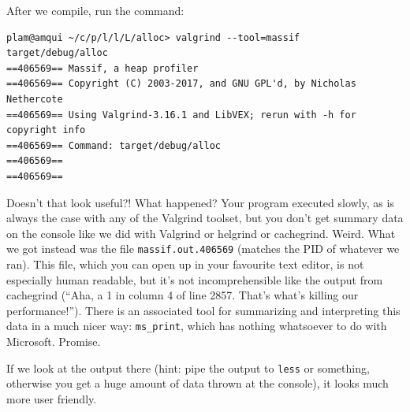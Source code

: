 \documentclass[a4paper]{report}
\begin{document}
After we compile, run the command:
{\scriptsize
\begin{verbatim}
plam@amqui ~/c/p/l/l/L/alloc> valgrind --tool=massif target/debug/alloc
==406569== Massif, a heap profiler
==406569== Copyright (C) 2003-2017, and GNU GPL'd, by Nicholas Nethercote
==406569== Using Valgrind-3.16.1 and LibVEX; rerun with -h for copyright info
==406569== Command: target/debug/alloc
==406569== 
==406569== 
\end{verbatim}
}

Doesn't that look useful?! What happened? Your program executed slowly, as is always the case with any of the Valgrind toolset, but you don't get summary data on the console like we did with Valgrind or helgrind or cachegrind. Weird. What we got instead was the file \texttt{massif.out.406569} (matches the PID of whatever we ran). This file, which you can open up in your favourite text editor, is not especially human readable, but it's not incomprehensible like the output from cachegrind (``Aha, a 1 in column 4 of line 2857. That's what's killing our performance!''). There is an associated tool for summarizing and interpreting this data in a much nicer way: \texttt{ms\_print}, which has nothing whatsoever to do with Microsoft. Promise.

If we look at the output there (hint: pipe the output to \texttt{less} or something, otherwise you get a huge amount of data thrown at the console), it looks much more user friendly.
\end{document}
